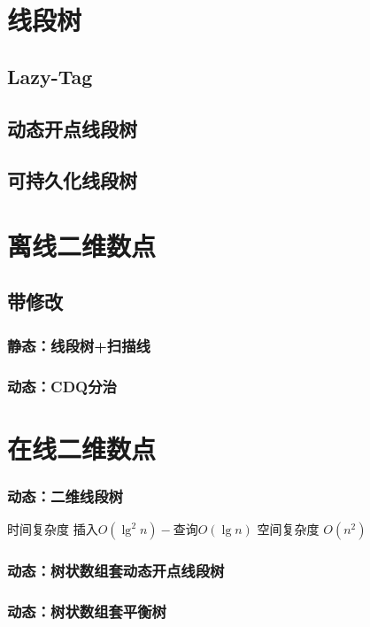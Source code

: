 \documentclass{article}
\begin{document}
	\newpage

	\section{线段树}
		\subsection{Lazy-Tag} %

		\subsection{动态开点线段树}

		\subsection{可持久化线段树}

	\section{离线二维数点}
		\subsection{带修改}
			\subsubsection{静态：线段树+扫描线}
			\subsubsection{动态：CDQ分治}
	\section{在线二维数点}
		\subsubsection{动态：二维线段树}
		时间复杂度 $\text{插入} O(\lg^2 n) - \text{查询} O(\lg n)$
		空间复杂度 $O(n^2)$
		\subsubsection{动态：树状数组套动态开点线段树}
		\subsubsection{动态：树状数组套平衡树}
	\newpage
\end{document}
